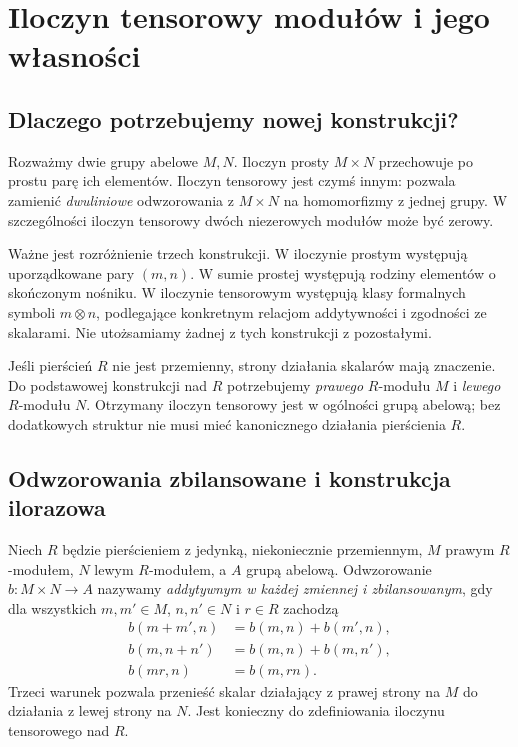 \chapter{Iloczyn tensorowy modułów i jego własności}
\label{aa:ch:module-tensor-product}

\providecommand{\atlasref}[2]{#2}


\section{Dlaczego potrzebujemy nowej konstrukcji?}
Rozważmy dwie grupy abelowe $M,N$. Iloczyn prosty $M\times N$
przechowuje po prostu parę ich elementów. Iloczyn tensorowy jest
czymś innym: pozwala zamienić \emph{dwuliniowe} odwzorowania
z $M\times N$ na homomorfizmy z jednej grupy. W szczególności
iloczyn tensorowy dwóch niezerowych modułów może być zerowy.

Ważne jest rozróżnienie trzech konstrukcji. W iloczynie prostym
występują uporządkowane pary $(m,n)$. W sumie prostej występują
rodziny elementów o skończonym nośniku. W iloczynie tensorowym
występują klasy formalnych symboli $m\otimes n$, podlegające
konkretnym relacjom addytywności i zgodności ze skalarami.
Nie utożsamiamy żadnej z tych konstrukcji z pozostałymi.

Jeśli pierścień $R$ nie jest przemienny, strony działania
skalarów mają znaczenie. Do podstawowej konstrukcji nad $R$
potrzebujemy \emph{prawego} $R$-modułu $M$ i \emph{lewego}
$R$-modułu $N$. Otrzymany iloczyn tensorowy jest w ogólności
grupą abelową; bez dodatkowych struktur nie musi mieć
kanonicznego działania pierścienia $R$.

\section{Odwzorowania zbilansowane i konstrukcja ilorazowa}
\begin{definicja}
\label{aa:def:tensor-balanced}
Niech $R$ będzie pierścieniem z jedynką, niekoniecznie
przemiennym, $M$ prawym $R$-modułem, $N$ lewym $R$-modułem,
a $A$ grupą abelową. Odwzorowanie $b:M\times N\to A$
nazywamy \emph{addytywnym w każdej zmiennej i zbilansowanym},
gdy dla wszystkich $m,m'\in M$, $n,n'\in N$ i $r\in R$ zachodzą
\[
\begin{split}
b(m+m',n)&=b(m,n)+b(m',n),\\
b(m,n+n')&=b(m,n)+b(m,n'),\\
b(mr,n)&=b(m,rn).
\end{split}
\]
Trzeci warunek pozwala przenieść skalar działający
z prawej strony na $M$ do działania z lewej strony na $N$.
Jest konieczny do zdefiniowania iloczynu tensorowego nad $R$.
\end{definicja}

